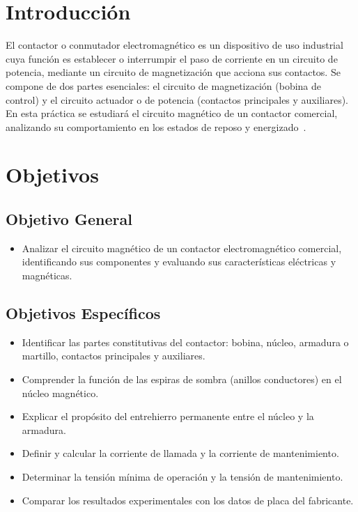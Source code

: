 \section{Introducción}

El contactor o conmutador electromagnético es un dispositivo de uso industrial cuya función es establecer o interrumpir el paso de corriente en un circuito de potencia, mediante un circuito de magnetización que acciona sus contactos. Se compone de dos partes esenciales: el circuito de magnetización (bobina de control) y el circuito actuador o de potencia (contactos principales y auxiliares). En esta práctica se estudiará el circuito magnético de un contactor comercial, analizando su comportamiento en los estados de reposo y energizado~\cite{mit,schneider}.

\section{Objetivos}

\subsection*{Objetivo General}
\begin{itemize}
    \item Analizar el circuito magnético de un contactor electromagnético comercial, identificando sus componentes y evaluando sus características eléctricas y magnéticas.
\end{itemize}

\subsection*{Objetivos Específicos}
\begin{itemize}
    \item Identificar las partes constitutivas del contactor: bobina, núcleo, armadura o martillo, contactos principales y auxiliares.
    \item Comprender la función de las espiras de sombra (anillos conductores) en el núcleo magnético.
    \item Explicar el propósito del entrehierro permanente entre el núcleo y la armadura.
    \item Definir y calcular la corriente de llamada y la corriente de mantenimiento.
    \item Determinar la tensión mínima de operación y la tensión de mantenimiento.
    \item Comparar los resultados experimentales con los datos de placa del fabricante.
\end{itemize}
